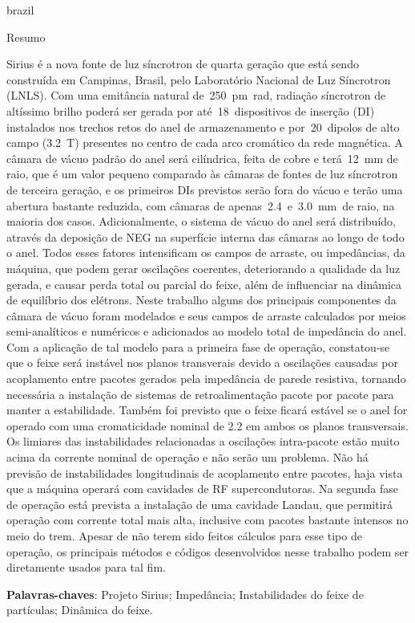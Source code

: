 \begin{otherlanguage*}{brazil}
    \begin{center}{\ABNTEXchapterfont\huge Resumo}\end{center}
    Sirius é a nova fonte de luz síncrotron de quarta geração que está sendo construída em Campinas, Brasil, pelo Laboratório Nacional de Luz Síncrotron (LNLS). Com uma emitância natural de~\SI{250}{\pico\meter\radian}, radiação síncrotron de altíssimo brilho poderá ser gerada por até~\num{18}~dispositivos de inserção (DI) instalados nos trechos retos do anel de armazenamento e por~\si{20}~dipolos de alto campo (\SI{3.2}{\tesla}) presentes no centro de cada arco cromático da rede magnética. A câmara de vácuo padrão do anel será cilíndrica, feita de cobre e terá~\SI{12}{\milli\meter} de raio, que é um valor pequeno comparado às câmaras de fontes de luz síncrotron de terceira geração, e os primeiros DIs previstos serão fora do vácuo e terão uma abertura bastante reduzida, com câmaras de apenas~\num{2.4}~e~\SI{3.0}{\milli\meter}~de raio, na maioria dos casos. Adicionalmente, o sistema de vácuo do anel será distribuído, através da deposição de NEG na superfície interna das câmaras ao longo de todo o anel. Todos esses fatores intensificam os campos de arraste, ou impedâncias, da máquina, que podem gerar oscilações coerentes, deteriorando a qualidade da luz gerada, e causar perda total ou parcial do feixe, além de influenciar na dinâmica de equilíbrio dos elétrons. Neste trabalho alguns dos principais componentes da câmara de vácuo foram modelados e seus campos de arraste calculados por meios semi-analíticos e numéricos e adicionados ao modelo total de impedância do anel. Com a aplicação de tal modelo para a primeira fase de operação, constatou-se que o feixe será instável nos planos transverais devido a oscilações causadas por acoplamento entre pacotes gerados pela impedância de parede resistiva, tornando necessária a instalação de sistemas de retroalimentação pacote por pacote para manter a estabilidade. Também foi previsto que o feixe ficará estável se o anel for operado com uma cromaticidade nominal de \num{2.2} em ambos os planos transversais. Os limiares das instabilidades relacionadas a oscilações intra-pacote estão muito acima da corrente nominal de operação e não serão um problema. Não há previsão de instabilidades longitudinais de acoplamento entre pacotes, haja vista que a máquina operará com cavidades de RF supercondutoras. Na segunda fase de operação está prevista a instalação de uma cavidade Landau, que permitirá operação com corrente total mais alta, inclusive com pacotes bastante intensos no meio do trem. Apesar de não terem sido feitos cálculos para esse tipo de operação, os principais métodos e códigos desenvolvidos nesse trabalho podem ser diretamente usados para tal fim.

    \vspace{\onelineskip}
    \noindent\textbf{Palavras-chaves}: Projeto Sirius; Impedância; Instabilidades do feixe de partículas; Dinâmica do feixe.
    \vspace{\fill}
\end{otherlanguage*}
\cleardoublepage

